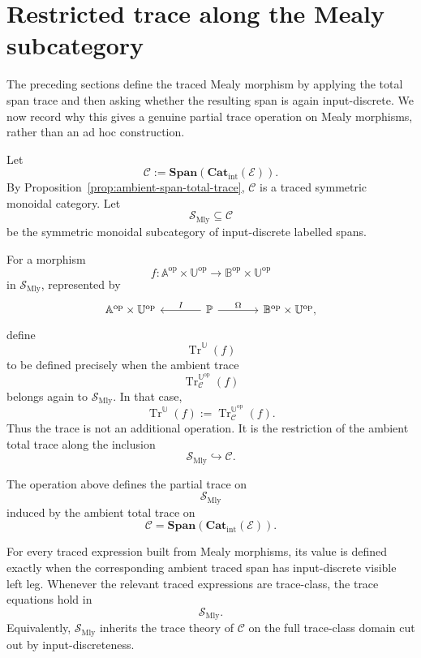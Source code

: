 \section{Restricted trace along the Mealy subcategory}
\label{sec:restricted-trace-along-mealy-subcategory}

The preceding sections define the traced Mealy morphism by applying the total
span trace and then asking whether the resulting span is again input-discrete.
We now record why this gives a genuine partial trace operation on Mealy
morphisms, rather than an ad hoc construction.

Let
\[
\mathcal C:=\mathbf{Span}(\mathbf{Cat}_{\mathrm{int}}(\mathcal E)).
\]
By Proposition~\ref{prop:ambient-span-total-trace}, \(\mathcal C\) is a traced
symmetric monoidal category.  Let
\[
\mathcal S_{\mathrm{Mly}}
\subseteq
\mathcal C
\]
be the symmetric monoidal subcategory of input-discrete labelled spans.

For a morphism
\[
f:
\mathbb A^{\mathrm{op}}\times\mathbb U^{\mathrm{op}}
\longrightarrow
\mathbb B^{\mathrm{op}}\times\mathbb U^{\mathrm{op}}
\]
in \(\mathcal S_{\mathrm{Mly}}\), represented by
\[
\begin{tikzcd}[column sep=large]
\mathbb A^{\mathrm{op}}\times\mathbb U^{\mathrm{op}}
&
\mathbb P
  \arrow[l, "I"']
  \arrow[r, "\Omega"]
&
\mathbb B^{\mathrm{op}}\times\mathbb U^{\mathrm{op}},
\end{tikzcd}
\]
define
\[
\operatorname{Tr}^{\mathbb U}(f)
\]
to be defined precisely when the ambient trace
\[
\operatorname{Tr}^{\mathbb U^{\mathrm{op}}}_{\mathcal C}(f)
\]
belongs again to \(\mathcal S_{\mathrm{Mly}}\).  In that case,
\[
\operatorname{Tr}^{\mathbb U}(f)
:=
\operatorname{Tr}^{\mathbb U^{\mathrm{op}}}_{\mathcal C}(f).
\]
Thus the trace is not an additional operation.  It is the restriction of the
ambient total trace along the inclusion
\[
\mathcal S_{\mathrm{Mly}}\hookrightarrow\mathcal C.
\]

\begin{theorem}
\label{thm:restricted-span-trace}
The operation above defines the partial trace on
\[
\mathcal S_{\mathrm{Mly}}
\]
induced by the ambient total trace on
\[
\mathcal C=
\mathbf{Span}(\mathbf{Cat}_{\mathrm{int}}(\mathcal E)).
\]

For every traced expression built from Mealy morphisms, its value is defined
exactly when the corresponding ambient traced span has input-discrete visible
left leg.  Whenever the relevant traced expressions are trace-class, the trace
equations hold in
\[
\mathcal S_{\mathrm{Mly}}.
\]
Equivalently, \(\mathcal S_{\mathrm{Mly}}\) inherits the trace theory of
\(\mathcal C\) on the full trace-class domain cut out by input-discreteness.
\end{theorem}

